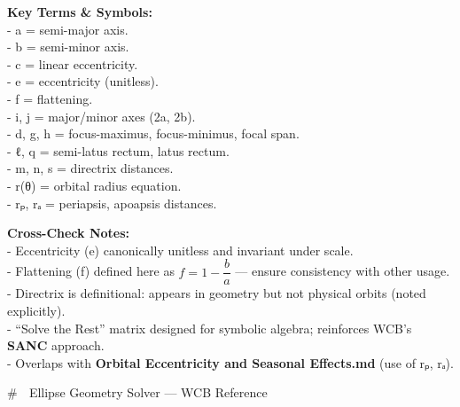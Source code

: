 \documentclass[
  letterpaper,
]{book}
\begin{document}
\textbf{Key Terms \& Symbols:}\\
- a = semi-major axis.\\
- b = semi-minor axis.\\
- c = linear eccentricity.\\
- e = eccentricity (unitless).\\
- f = flattening.\\
- i, j = major/minor axes (2a, 2b).\\
- d, g, h = focus-maximus, focus-minimus, focal span.\\
- ℓ, q = semi-latus rectum, latus rectum.\\
- m, n, s = directrix distances.\\
- r(θ) = orbital radius equation.\\
- rₚ, rₐ = periapsis, apoapsis distances.

\textbf{Cross-Check Notes:}\\
- Eccentricity (e) canonically unitless and invariant under scale.\\
- Flattening (f) defined here as \(f = 1 - \dfrac{b}{a}\) --- ensure
consistency with other usage.\\
- Directrix is definitional: appears in geometry but not physical orbits
(noted explicitly).\\
- ``Solve the Rest'' matrix designed for symbolic algebra; reinforces
WCB's \textbf{SANC} approach.\\
- Overlaps with \textbf{Orbital Eccentricity and Seasonal Effects.md}
(use of rₚ, rₐ).

\# 🧭 Ellipse Geometry Solver --- WCB Reference
\end{document}
